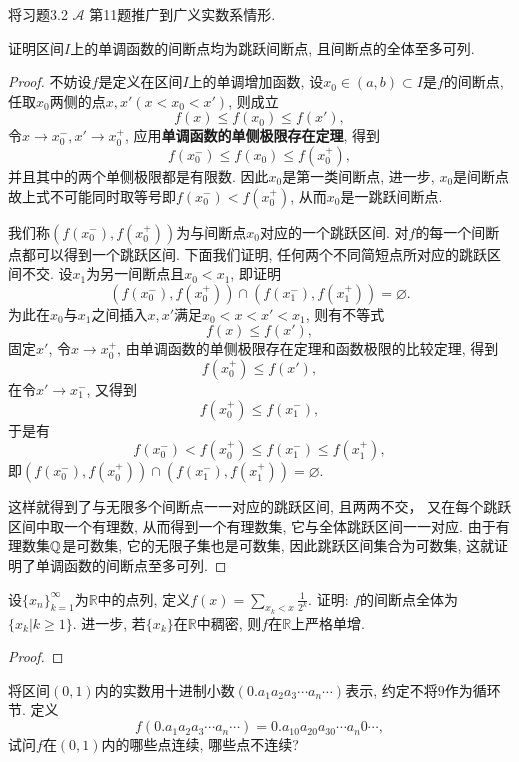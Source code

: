 \begin{quizb}
\woe 将习题3.2 \(\boldsymbol{\mathcal{A}}\) 第11题推广到广义实数系情形.
\begin{solution}
	
\end{solution}
\woe 证明区间\(I\)上的单调函数的间断点均为跳跃间断点, 且间断点的全体至多可列.
\begin{proof}
不妨设\(f\)是定义在区间\(I\)上的单调增加函数, 设\(x_0\in(a,b)\subset I\)是\(f\)的间断点, 任取\(x_0\)两侧的点\(x,x'(x<x_0<x')\), 则成立\[f(x)\leqslant f(x_0)\leqslant f(x'),\]令\(x\rightarrow x_0^-,x'\rightarrow x_0^+\), 应用\textbf{单调函数的单侧极限存在定理}, 得到\[f(x_0^-)\leqslant f(x_0)\leqslant f(x_0^+),\]并且其中的两个单侧极限都是有限数. 因此\(x_0\)是第一类间断点, 进一步, \(x_0\)是间断点故上式不可能同时取等号即\(f(x_0^-)<f(x_0^+)\), 从而\(x_0\)是一跳跃间断点.

我们称\(\left(f(x_0^-),f(x_0^+)\right)\)为与间断点\(x_0\)对应的一个跳跃区间. 对\(f\)的每一个间断点都可以得到一个跳跃区间. 下面我们证明, 任何两个不同简短点所对应的跳跃区间不交. 设\(x_1\)为另一间断点且\(x_0<x_1\), 即证明\[\left(f(x_0^-),f(x_0^+)\right)\cap \left(f(x_1^-),f(x_1^+)\right)=\varnothing.\]
为此在\(x_0\)与\(x_1\)之间插入\(x,x'\)满足\(x_0<x<x'<x_1\), 则有不等式\[f(x)\leqslant f(x'),\]固定\(x'\), 令\(x\rightarrow x_0^+\), 由单调函数的单侧极限存在定理和函数极限的比较定理, 得到\[f(x_0^+)\leqslant f(x'),\]在令\(x'\rightarrow x_1^-\), 又得到\[f(x_0^+)\leqslant f(x_1^-),\]于是有\[f(x_0^-)<f(x_0^+)\leqslant f(x_1^-)\leqslant f(x_1^+),\]即\(\left(f(x_0^-),f(x_0^+)\right)\cap \left(f(x_1^-),f(x_1^+)\right)=\varnothing.\)

这样就得到了与无限多个间断点一一对应的跳跃区间, 且两两不交， 又在每个跳跃区间中取一个有理数, 从而得到一个有理数集, 它与全体跳跃区间一一对应. 由于有理数集\(\mathbb{Q}\)是可数集, 它的无限子集也是可数集, 因此跳跃区间集合为可数集, 这就证明了单调函数的间断点至多可列.
\end{proof}
\woe 设\(\{x_n\}_{k=1}^{\infty}\)为\(\mathbb{R}\)中的点列, 定义\(f(x)=\sum_{x_k<x}\frac{1}{2^k}\). 证明: \(f\)的间断点全体为\(\{x_k\left|k\geqslant 1\right.\}\). 进一步, 若\(\{x_k\}\)在\(\mathbb{R}\)中稠密, 则\(f\)在\(\mathbb{R}\)上严格单增.
\begin{proof}
	
\end{proof}
\woe 将区间\((0,1)\)内的实数用十进制小数\((0.a_1a_2a_3\cdots a_n\cdots)\)表示, 约定不将\(9\)作为循环节. 定义\[f(0.a_1a_2a_3\cdots a_n\cdots)=0.a_10a_20a_30\cdots a_n0\cdots,\]试问\(f\)在\((0,1)\)内的哪些点连续, 哪些点不连续?
\begin{solution}
	

\end{solution}
\end{quizb}
